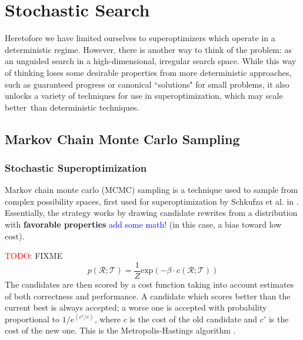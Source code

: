 \documentclass[12pt,twoside]{reedthesis}
\newcommand{\red}[1]{\textcolor{red}{#1}}
\newcommand{\comment}[2]{\textbf{#1} \textcolor{blue}{#2}}
\begin{document}

\chapter{Stochastic Search}
    Heretofore we have limited ourselves to superoptimizers which operate in a deterministic regime.
    However, there is another way to think of the problem: as an unguided search in a high-dimensional, irregular search space.
    While this way of thinking loses some desirable properties from more deterministic approaches, such as guaranteed progress or canonical ``solutions" for small problems, it also unlocks a variety of techniques for use in superoptimization, which may scale better\footnotemark\, than deterministic techniques.
    

    \section{Markov Chain Monte Carlo Sampling}
    \subsection{Stochastic Superoptimization}
        Markov chain monte carlo (MCMC) sampling is a technique used to sample from complex possibility spaces, first used for superoptimization by Schkufza et al. in \cite{schkufza2013stoke}.
        Essentially, the strategy works by drawing candidate rewrites from a distribution with \comment{favorable properties}{add some math!} (in this case, a bias toward low cost). %
        
        \red{TODO}: FIXME
        \[
            p(\mathcal{R;T}) = \frac{1}{Z} \mathrm{exp}\left(-\beta \cdot c(\mathcal{R;T})\right)
        \]
        The candidates are then scored by a cost function taking into account estimates of both correctness and performance.
        A candidate which scores better than the current best is always accepted; a worse one is accepted with probability proportional to $1/e^{(c'/c)}$, where $c$ is the cost of the old candidate and $c'$ is the cost of the new one. 
        This is the Metropolis-Hastings algorithm \cite{metropolis1953montecarlo} \cite{hastings1970mcmc}.
        
\end{document}
